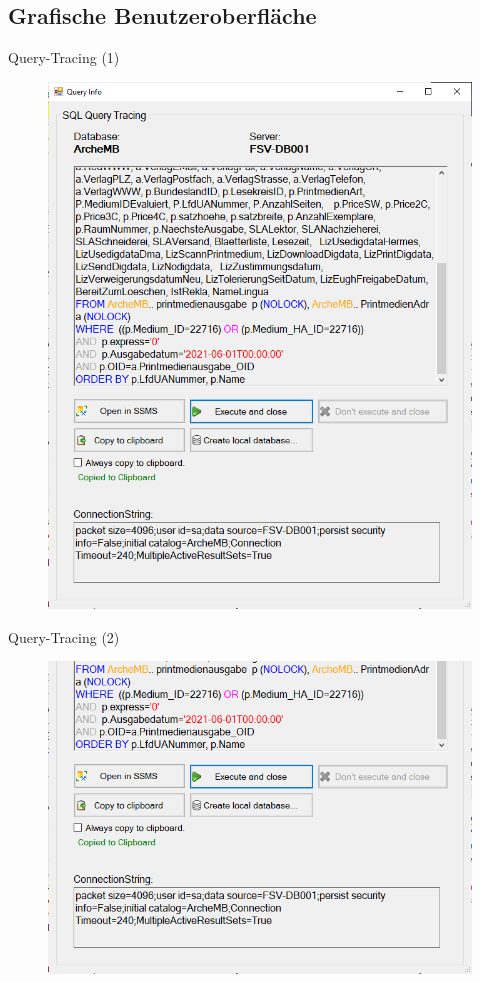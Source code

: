 \documentclass[toc]{beamer}
\begin{document}
    \subsection{Grafische Benutzeroberfläche}
        \begin{frame}{Query-Tracing (1)}
            \begin{figure}[htp]
                \includegraphics[scale=0.5]{gui.png}
            \end{figure}
        \end{frame}
        
        \begin{frame}{Query-Tracing (2)}
            \begin{figure}[htp]
                \includegraphics[scale=0.4]{gui_crop.png}
            \end{figure}
        \end{frame}
\end{document}
